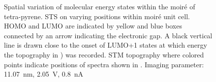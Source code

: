 \begin{figure}[] \centering
	\caption{Spatial variation of molecular energy states within the moir\'e of tetra-pyrene.  STS on varying positions within moir\'e unit cell. HOMO and LUMO are indicated by yellow and blue boxes connected by an arrow indicating the electronic gap. A black vertical line is drawn close to the onset of LUMO+1 states at which energy the topography in ) was recorded.  STM topography where colored points indicate positions of spectra shown in . Imaging parameter: \SI{11.07}{\nano \meter}, \SI{2.05}{\volt}, \SI{0.8}{\nano \ampere}}
	\label{fig:pyrene-fig4}
\end{figure}

